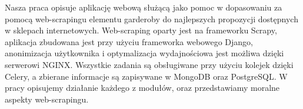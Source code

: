 
Nasza praca opisuje aplikację webową służącą jako pomoc w dopasowaniu za pomocą web-scrapingu elementu garderoby do najlepszych propozycji dostępnych w sklepach internetowych. Web-scraping oparty jest na frameworku Scrapy, aplikacja zbudowana jest przy użyciu frameworka webowego Django, anonimizacja użytkownika i optymalizacja wydajnościowa jest możliwa dzięki serwerowi NGINX. Wszystkie zadania są obsługiwane przy użyciu kolejek dzięki Celery, a zbierane informacje są zapisywane w MongoDB oraz PostgreSQL. W pracy opisujemy działanie każdego z modułów, oraz przedstawiamy moralne aspekty web-scrapingu.